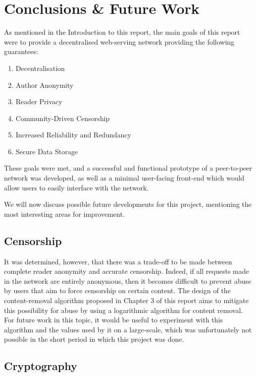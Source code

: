 \chapter{Conclusions \& Future Work}

As mentioned in the Introduction to this report, the main goals of this report were
to provide a decentralised web-serving network providing the following guarantees:

\begin{enumerate}
    \item{Decentralisation}
    \item{Author Anonymity}
    \item{Reader Privacy}
    \item{Community-Driven Censorship}
    \item{Increased Reliability and Redundancy}
    \item{Secure Data Storage}
\end{enumerate}

These goals were met, and a successful and functional prototype of a peer-to-peer
network was developed, as well as a minimal user-facing front-end which would allow
users to easily interface with the network.

We will now discuss possible future developments for this project, mentioning the most
interesting areas for improvement.

\section{Censorship}

It was determined, however, that there was a trade-off to be made between complete
reader anonymity and accurate censorship. Indeed, if all requests made in the network
are entirely anonymous, then it becomes difficult to prevent abuse by users that
aim to force censorship on certain content. The design of the content-removal algorithm
proposed in Chapter 3 of this report aims to mitigate this possibility for abuse
by using a logarithmic algorithm for content removal. For future work in this
topic, it would be useful to experiment with this algorithm and the values used by
it on a large-scale, which was unfortunately not possible in the short period in which this
project was done.

\section{Cryptography}

